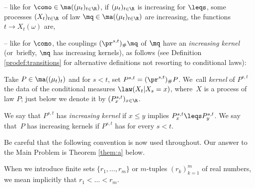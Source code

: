 -- like for $\como\in \ma((\mu_t)_{t\in \R})$, if $(\mu_t)_{t\in \R}$ is increasing for $\leqs$, some processes $(X_t)_{t\in\R}$ of law $\mq\in \ma((\mu_t)_{t\in \R})$ are increasing, \ie the functions $t\to X_t(\omega)$ are,

-- like for $\como$, the couplings $(\pr^{s,t})_\#\mq$ of $\mq$ have an \emph{increasing kernel} (or~briefly, $\mq$ has increasing kernels), as follows (see Definition \ref{prodef:transitions} for alternative definitions not resorting to conditional laws):

\begin{defi}\label{defi:increasing_kernel_intro}Take $P\in\ma((\mu_t)_t)$ and for $s<t$, set $P^{s,t}=(\pr^{s,t})_\#P$. We~call \emph{kernel} of $P^{s,t}$ the data of the conditional measures $\law(X_t|X_{s}=x)$, where~$X$ is a process of law $P$; just below we denote it by $(P^{s,t}_x)_{x\in \R}$.

We say that $P^{s,t}$ has \emph{increasing kernel} if $x\leqslant y$ implies $P^{s,t}_x\leqs P^{s,t}_y$. We say that~$P$ has increasing kernels if $P^{s,t}$ has for every $s< t$.
\end{defi}

Be careful that the following convention is now used throughout. Our answer to the Main Problem is Theorem \ref{them:a} below.

\begin{convention}\label{conv:croissant}When we introduce finite sets $\{r_1,\ldots,r_m\}$ or $m$-tuples $(r_k)^m_{k=1}$ of real numbers, we mean implicitly that $r_1<\ldots<r_m$.
\end{convention}

